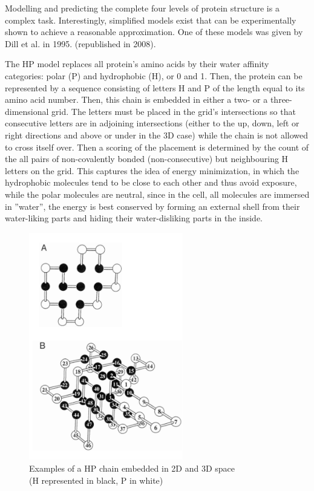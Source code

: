 Modelling and predicting the complete four levels of protein structure is a complex task. Interestingly, simplified models exist that can be experimentally shown to achieve a reasonable approximation. One of these models was given by Dill et al. in 1995. (republished in 2008).\cite{dill_principles_2008} 

The HP model replaces all protein's amino acids by their water affinity categories: polar (P) and hydrophobic (H), or 0 and 1. Then, the protein can be represented by a sequence consisting of letters H and P of the length equal to its amino acid number. Then, this chain is embedded in either a two- or a three-dimensional grid. The letters must be placed in the grid's intersections so that consecutive letters are in adjoining intersections (either to the up, down, left or right directions and above or under in the 3D case) while the chain is not allowed to cross itself over. Then a scoring of the placement is determined by the count of the all pairs of non-covalently bonded (non-consecutive) but neighbouring H letters on the grid. This captures the idea of energy minimization, in which the hydrophobic molecules tend to be close to each other and thus avoid exposure, while the polar molecules are neutral, since in the cell, all molecules are immersed in ''water'', the energy is best conserved by forming an external shell from their water-liking parts and hiding their water-disliking parts in the inside.

\begin{figure}[H]
    \centering
    \includegraphics[width=0.6\textwidth]{figures/bioinformatics/hp_model.png}
    \caption{Examples of a HP chain embedded in 2D and 3D space\\(H represented in black, P in white)\cite{dill_principles_2008}}
\end{figure}

